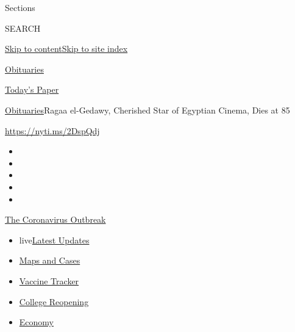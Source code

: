 Sections

SEARCH

\protect\hyperlink{site-content}{Skip to
content}\protect\hyperlink{site-index}{Skip to site index}

\href{https://www.nytimes.com/section/obituaries}{Obituaries}

\href{https://myaccount.nytimes.com/auth/login?response_type=cookie\&client_id=vi}{}

\href{https://www.nytimes.com/section/todayspaper}{Today's Paper}

\href{/section/obituaries}{Obituaries}\textbar{}Ragaa el-Gedawy,
Cherished Star of Egyptian Cinema, Dies at 85

\url{https://nyti.ms/2DspQdj}

\begin{itemize}
\item
\item
\item
\item
\item
\end{itemize}

\href{https://www.nytimes.com/news-event/coronavirus?action=click\&pgtype=Article\&state=default\&region=TOP_BANNER\&context=storylines_menu}{The
Coronavirus Outbreak}

\begin{itemize}
\tightlist
\item
  live\href{https://www.nytimes.com/2020/08/03/world/coronavirus-covid-19.html?action=click\&pgtype=Article\&state=default\&region=TOP_BANNER\&context=storylines_menu}{Latest
  Updates}
\item
  \href{https://www.nytimes.com/interactive/2020/us/coronavirus-us-cases.html?action=click\&pgtype=Article\&state=default\&region=TOP_BANNER\&context=storylines_menu}{Maps
  and Cases}
\item
  \href{https://www.nytimes.com/interactive/2020/science/coronavirus-vaccine-tracker.html?action=click\&pgtype=Article\&state=default\&region=TOP_BANNER\&context=storylines_menu}{Vaccine
  Tracker}
\item
  \href{https://www.nytimes.com/2020/08/02/us/covid-college-reopening.html?action=click\&pgtype=Article\&state=default\&region=TOP_BANNER\&context=storylines_menu}{College
  Reopening}
\item
  \href{https://www.nytimes.com/live/2020/08/03/business/stock-market-today-coronavirus?action=click\&pgtype=Article\&state=default\&region=TOP_BANNER\&context=storylines_menu}{Economy}
\end{itemize}

